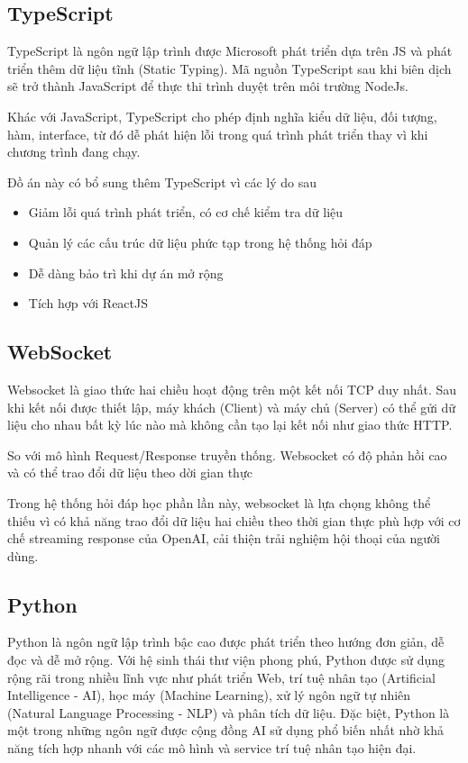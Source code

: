 \documentclass[../DoAn.tex]{subfiles}
\begin{document}
\subsection{TypeScript}
TypeScript là ngôn ngữ lập trình được Microsoft phát triển dựa trên JS và phát triển thêm dữ liệu tĩnh (Static Typing). Mã nguồn TypeScript sau khi biên dịch
sẽ trở thành JavaScript để thực thi trình duyệt trên môi trường NodeJs.

Khác với JavaScript, TypeScript cho phép định nghĩa kiểu dữ liệu, đối tượng, hàm, interface, từ đó dễ phát hiện lỗi trong quá trình phát triển thay vì khi chương trình đang chạy.

Đồ án này có bổ sung thêm TypeScript vì các lý do sau
\begin{itemize}
    \item Giảm lỗi quá trình phát triển, có cơ chế kiểm tra dữ liệu
    \item Quản lý các cấu trúc dữ liệu phức tạp trong hệ thống hỏi đáp
    \item Dễ dàng bảo trì khi dự án mở rộng
    \item Tích hợp với ReactJS
\end{itemize}

\subsection{WebSocket}
Websocket là giao thức hai chiều hoạt động trên một kết nối TCP duy nhất. Sau khi kết nối được thiết lập, máy khách (Client) và máy chủ (Server) có thể gửi dữ liệu cho nhau bất kỳ lúc nào mà không cần tạo lại kết nối như giao thức HTTP.

So với mô hình Request/Response truyền thống. Websocket có độ phản hồi cao và có thể trao đổi dữ liệu theo dời gian thực

Trong hệ thống hỏi đáp học phần lần này, websocket là lựa chọng không thể thiếu vì có khả năng trao đổi dữ liệu hai chiều theo thời gian thực phù hợp với cơ chế streaming response của OpenAI, cải thiện trải nghiệm hội thoại của người dùng.

\subsection{Python}
Python là ngôn ngữ lập trình bậc cao được phát triển theo hướng đơn giản, dễ đọc và dễ mở rộng. Với hệ sinh thái thư viện phong phú, Python được sử dụng rộng rãi trong nhiều lĩnh vực như phát triển Web, trí tuệ nhân tạo (Artificial Intelligence - AI), học máy (Machine Learning), xử lý ngôn ngữ tự nhiên (Natural Language Processing - NLP) và phân tích dữ liệu. Đặc biệt, Python là một trong những ngôn ngữ được cộng đồng AI sử dụng phổ biến nhất nhờ khả năng tích hợp nhanh với các mô hình và service trí tuệ nhân tạo hiện đại.
\end{document}
